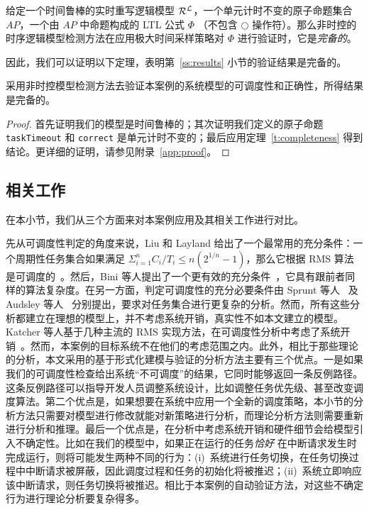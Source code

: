 \begin{theorem}
\label{t:completeness}
给定一个时间鲁棒的实时重写逻辑模型 $\mathcal{R}^{\mathcal{L}}$，一个单元计时不变的原子命题集合 $AP$，一个由 $AP$ 中命题构成的 LTL 公式 $\Phi$ （不包含 $\bigcirc$ 操作符）。那么非时控的时序逻辑模型检测方法在应用极大时间采样策略对 $\Phi$ 进行验证时，它是\emph{完备的}。
\end{theorem}

因此，我们可以证明以下定理，表明第~\ref{ss:results} 小节的验证结果是完备的。
\begin{theorem}
\label{t:main}
采用非时控模型检测方法去验证本案例的系统模型的可调度性和正确性，所得结果是完备的。
\end{theorem}
\begin{proof}
首先证明我们的模型是时间鲁棒的；其次证明我们定义的原子命题 \verb|taskTimeout| 和 \verb|correct| 是单元计时不变的；最后应用定理~\ref{t:completeness} 得到结论。更详细的证明，请参见附录~\ref{app:proof}。
\end{proof}


\subsection{相关工作}
\label{s:relate}
在本小节，我们从三个方面来对本案例应用及其相关工作进行对比。

先从可调度性判定的角度来说，Liu 和 Layland 给出了一个最常用的充分条件：一个周期性任务集合如果满足 $\Sigma^n_{i=1} C_i/T_i \le n(2^{1/n}-1)$，那么它根据 RMS 算法是可调度的~\cite{DBLP:journals/jacm/LiuL73}。然后，Bini 等人提出了一个更有效的充分条件~\cite{DBLP:journals/tc/BiniBB03}，它具有跟前者同样的算法复杂度。在另一方面，判定可调度性的充分必要条件由 Sprunt 等人~\cite{DBLP:journals/rts/SpruntSL89} 及 Audsley 等人~\cite{audsley1993deadline} 分别提出，要求对任务集合进行更复杂的分析。然而，所有这些分析都建立在理想的模型上，并不考虑系统开销，真实性不如本文建立的模型。Katcher 等人基于几种主流的 RMS 实现方法，在可调度性分析中考虑了系统开销~\cite{DBLP:journals/tse/KatcherAS93}。然而，本案例的目标系统不在他们的考虑范围之内。此外，相比于那些理论的分析，本文采用的基于形式化建模与验证的分析方法主要有三个优点。一是如果我们的可调度性检查给出系统“不可调度”的结果，它同时能够返回一条反例路径。这条反例路径可以指导开发人员调整系统设计，比如调整任务优先级、甚至改变调度算法。第二个优点是，如果想要在系统中应用一个全新的调度策略，本小节的分析方法只需要对模型进行修改就能对新策略进行分析，而理论分析方法则需要重新进行分析和推理。最后一个优点是，在分析中考虑系统开销和硬件细节会给模型引入不确定性。比如在我们的模型中，如果正在运行的任务\emph{恰好} 在中断请求发生时完成运行，则将可能发生两种不同的行为：(i)~系统进行任务切换，在任务切换过程中中断请求被屏蔽，因此调度过程和任务的初始化将被推迟；(ii)~系统立即响应该中断请求，则任务切换将被推迟。相比于本案例的自动验证方法，对这些不确定行为进行理论分析要复杂得多。

